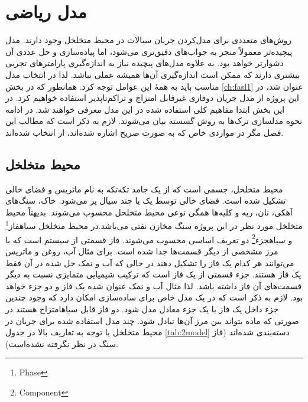 \chapter{مدل ریاضی}
\label{ch:fasl2}

روش‌های متعددی برای مدل‌کردن جریان سیالات در محیط متخلخل وجود دارند. مدل پیچیده‌تر معمولاً منجر به جواب‌های دقیق‌تری می‌شود، اما پیاده‌سازی و حل عددی آن دشوارتر خواهد بود. به علاوه مدل‌های پیچیده نیاز به اندازه‌گیری پارامتر‌های تجربی بیشتری دارند که ممکن است اندازه‌گیری آن‌ها همیشه عملی نباشد. لذا در انتخاب مدل مناسب باید به همهٔ این عوامل توجه کرد. همانطور که در بخش \ref{ch:fasl1} عنوان شد، در این پروژه از مدل جریان دوفازی غیرقابل امتزاج و تراکم‌ناپذیر استفاده خواهیم کرد. در این بخش ابتدا مفاهیم کلی استفاده شده در این مدل معرفی خواهند شد. در ادامه نحوه مدلسازی ترک‌ها به روش گسسته بیان می‌شوند. لازم به ذکر است که مطالب این فصل مگر در مواردی خاص که به صورت صریح اشاره شده‌اند، از \cite{basthabil,bear} انتخاب شده‌اند.


\section{محیط متخلخل}
محیط متخلخل، جسمی است که از یک جامد تکه‌تکه به نام ماتریس و فضای خالی تشکیل شده است. فضای خالی توسط یک یا چند سیال پر می‌شود. خاک، سنگ‌های آهکی، نان، ریه و کلیه‌ها همگی نوعی محیط متخلخل محسوب می‌شوند. بدیهتاً محیط متخلخل مورد نظر در این پروژه سنگ مخازن نفتی می‌باشد.در محیط متخلخل \text‌سیاه{فاز}\footnote{Phase} و \text‌سیاه{جزء}\footnote{Component} دو تعریف اساسی محسوب می‌شوند. فاز قسمتی از سیستم است که با مرز مشخصی از دیگر قسمت‌ها جدا شده است. برای مثال آب، روغن و ماتریس می‌توانند هر کدام یک فاز را تشکیل دهند در حالی که آب و نمک حل شده در آن فقط یک فاز هستند. جزء قسمتی از یک فاز است که ترکیب شیمیایی متمایزی نسبت به دیگر قسمت‌های آن فاز داشته باشد. لذا مثال آب و نمک عنوان شده یک فاز و دو جزء خواهد بود. لازم به ذکر است که در یک مدل خاص برای ساده‌سازی امکان دارد که وجود چندین جزء داخل یک فاز با یک جزء معادل مدل شود. دو فاز قابل \text‌سیاه{امتزاج} هستند در صورتی که ماده بتواند بین مرز آن‌ها تبادل شود. چند مدل استفاده شده برای جریان در محیط متخلخل با توجه به تعاریف بالا در جدول \ref{tab:2model} دسته‌بندی شده‌اند (فاز سنگ در نظر نگرفته نشده‌است).


